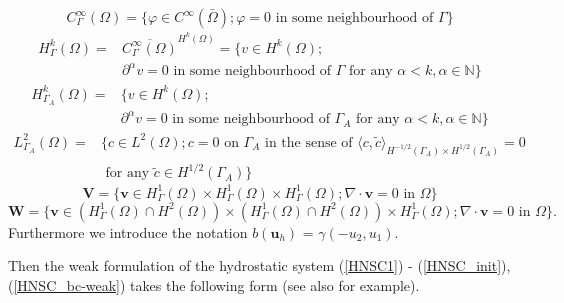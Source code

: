 \documentclass[11pt, a4paper]{article}
\begin{document}
$$C^{\infty}_\Gamma (\Omega) = \{ \varphi \in C^\infty (\bar{\Omega}); \varphi = 0 \text{ in some neighbourhood of } \Gamma\}$$
%
\begin{align}
H^k_{\Gamma} (\Omega) = & \overline{C_\Gamma ^ \infty (\Omega)} ^ {H^k (\Omega)} = \{ v \in H^k(\Omega); \nonumber \\
& \partial^\alpha v=0 \text{ in some neighbourhood of } \Gamma \text{ for any } \alpha < k, \alpha \in \mathbb{N} \nonumber \}
\end{align}
%
\begin{align}
H^k_{\Gamma_A} (\Omega) = & \{ v \in H^k(\Omega); \nonumber \\
& \partial^\alpha v=0 \text{ in some neighbourhood of } \Gamma_A \text{ for any } \alpha < k, \alpha \in \mathbb{N} \nonumber \}
\end{align}
%
\begin{align}
L^2_{\Gamma_A}(\Omega) = & \{ c \in L^2(\Omega); c = 0 \text{ on } \Gamma_A \text{ in the sense of } \langle c , \tilde{c} \rangle_{H^{-1/2} (\Gamma_A) \times H^{1/2} (\Gamma_A)} = 0 \nonumber \\
& \text{ for any } \tilde{c} \in H^{1/2}(\Gamma_A) \nonumber \}
\end{align}
%
$$ \mathbf{V} = \{ \mathbf{v} \in H^1_{\Gamma} (\Omega) \times H^1_{\Gamma} (\Omega) \times H^1_{\Gamma} (\Omega); \nabla \cdot \mathbf{v} = 0 \text{ in } \Omega \} $$
%
$$\mathbf{W} = \{ \mathbf{v} \in (H^1_{\Gamma} (\Omega) \cap H^2(\Omega)) \times (H^1_{\Gamma} (\Omega) \cap H^2(\Omega)) \times H^1_{\Gamma} (\Omega); \nabla \cdot \mathbf{v} = 0 \text{ in } \Omega \}. $$
Furthermore we introduce the notation $b(\mathbf{u}_h)$ = $\gamma ( - u_2 , u_1).$

Then the weak formulation of the hydrostatic system (\ref{HNSC1}) - (\ref{HNSC_init}), (\ref{HNSC_bc-weak}) takes the following form (see also \cite{cao2007global} for example).
\end{document}
